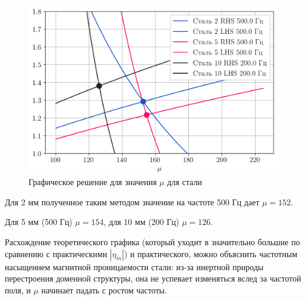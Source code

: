 \begin{figure}[H]
	\centering
	\includegraphics[width = 0.95\linewidth]{imgs/graphs/mu.png}
	\caption{Графическое решение для значения $\mu$ для стали}
	\label{fig:mu}
\end{figure}

Для 2 мм полученное таким методом значение на частоте 500 Гц дает $\mu=152$.

Для 5 мм (500 Гц) $\mu=154$, для 10 мм (200 Гц) $\mu=126$.


Расхождение теоретического графика (который уходит в значительно большие по сравнению с практическими $|\eta_m|$)  и
практического, можно объяснить частотным насыщением магнитной проницаемости стали: из-за инертной природы перестроения
доменной структуры, она не успевает изменяться вслед за частотой поля, и $\mu$ начинает падать с ростом частоты.

